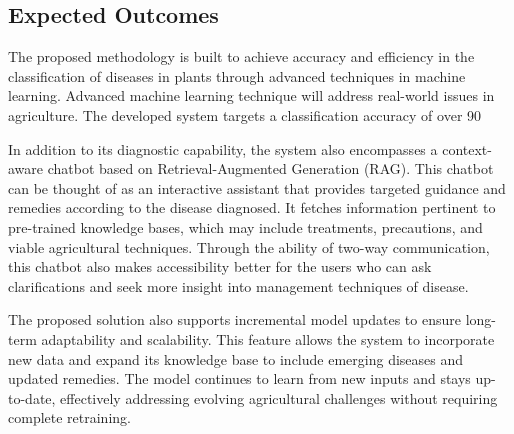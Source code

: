 \subsection{ Expected Outcomes}

The proposed methodology is built to achieve accuracy and efficiency in the classification of diseases in plants through advanced techniques in machine learning. Advanced machine learning technique will address real-world issues in agriculture. The developed system targets a classification accuracy of over 90%

In addition to its diagnostic capability, the system also encompasses a context-aware chatbot based on Retrieval-Augmented Generation (RAG). This chatbot can be thought of as an interactive assistant that provides targeted guidance and remedies according to the disease diagnosed. It fetches information pertinent to pre-trained knowledge bases, which may include treatments, precautions, and viable agricultural techniques. Through the ability of two-way communication, this chatbot also makes accessibility better for the users who can ask clarifications and seek more insight into management techniques of disease.

The proposed solution also supports incremental model updates to ensure long-term adaptability and scalability. This feature allows the system to incorporate new data and expand its knowledge base to include emerging diseases and updated remedies. The model continues to learn from new inputs and stays up-to-date, effectively addressing evolving agricultural challenges without requiring complete retraining.

